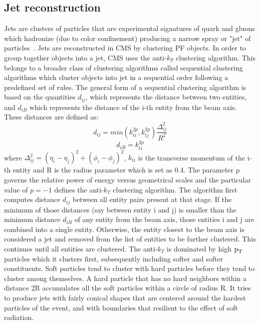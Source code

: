 \subsection{Jet reconstruction}
\label{jet_recon}
Jets are clusters of particles that are experimental signatures of quark and gluons which hadronize (due to color confinement) producing a narrow spray or "jet" of particles~\cite{jet_recon}. Jets are reconstructed in CMS by clustering PF objects. In order to group together objects into a jet, CMS uses the anti-$k_{T}$ clustering algorithm. This belongs to a broader class of clustering algorithms called sequential clustering algorithms which cluster objects into jet in a sequential order following a predefined set of rules. The general form of a sequential clustering algorithm is based on the quantities  $d_{ij}$, which represents the distance between two entities, and $d_{iB}$ which represents the distance of the i-th entity from the beam axis. These distances are defined as:
\begin{equation}
  d_{ij}=min(k_{ti}^{2p},k_{tj}^{2p})\frac{\Delta_{ij}^{2}}{R^2}
\end{equation}
\begin{equation}
  d_{iB}=k_{ti}^{2p}
\end{equation}
where $\Delta_{ij}^{2}=(\eta_i-\eta_j)^2+(\phi_i-\phi_j)^2$, $k_{ti}$ is the transverse momentum of the i-th entity and R is the radius parameter which is set as 0.4. The parameter p governs the relative power of energy versus geometrical scales and the particular value of $p=-1$ defines the anti-$k_{T}$ clustering algorithm. The algorithm first computes distance $d_{ij}$ between all entity pairs present at that stage. If the minimum of those distances (say between entity i and j) is smaller than the minimum distance $d_{iB}$ of any entity from the beam axis, those entities i and j are combined into a single entity. Otherwise, the entity closest to the beam axis is considered a jet and removed from the list of entities to be further clustered. This continues until all entities are clustered. The anti-$k_{T}$ is dominated by high $\text{p}_\text{T}$ particles which it clusters first, subsequently including softer and softer constituents. Soft particles tend to cluster with hard particles before they tend to cluster among themselves. A hard particle that has no hard neighbors within a distance 2R accumulates all the soft particles within a circle of radius R. It tries to produce jets with fairly conical shapes that are centered around the hardest particles of the event, and with boundaries that resilient to the effect of soft radiation.

